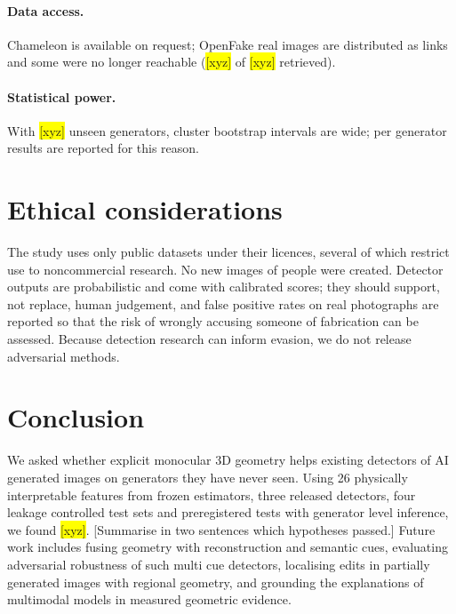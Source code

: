\documentclass[11pt,a4paper]{article}
\newcommand{\xyz}[1][]{\colorbox{yellow}{[xyz]}}
\begin{document}
\paragraph{Data access.} Chameleon is available on request; OpenFake real images are distributed as links and some were no longer reachable (\xyz[manual.openfake_retrieved]{} of \xyz[manual.openfake_requested]{} retrieved).

\paragraph{Statistical power.} With \xyz[ext.n_unseen_generators]{} unseen generators, cluster bootstrap intervals are wide; per generator results are reported for this reason.

\section{Ethical considerations}

The study uses only public datasets under their licences, several of which restrict use to noncommercial research. No new images of people were created. Detector outputs are probabilistic and come with calibrated scores; they should support, not replace, human judgement, and false positive rates on real photographs are reported so that the risk of wrongly accusing someone of fabrication can be assessed. Because detection research can inform evasion, we do not release adversarial methods.

\section{Conclusion}
\label{sec:conclusion}

We asked whether explicit monocular 3D geometry helps existing detectors of AI generated images on generators they have never seen. Using 26 physically interpretable features from frozen estimators, three released detectors, four leakage controlled test sets and preregistered tests with generator level inference, we found \xyz[manual.conclusion]. [Summarise in two sentences which hypotheses passed.] Future work includes fusing geometry with reconstruction and semantic cues, evaluating adversarial robustness of such multi cue detectors, localising edits in partially generated images with regional geometry, and grounding the explanations of multimodal models in measured geometric evidence.
\end{document}
